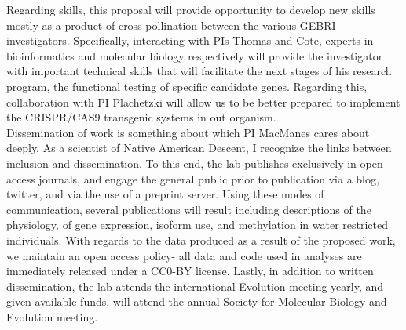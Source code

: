 \documentclass[11pt]{article}
\begin{document}
Regarding skills, this proposal will provide opportunity to develop new skills mostly as a product of cross-pollination between the various GEBRI investigators. Specifically, interacting with PIs Thomas and Cote, experts in bioinformatics and molecular biology respectively will provide the investigator with important technical skills that will facilitate the next stages of his research program, the functional testing of specific candidate genes. Regarding this, collaboration with PI Plachetzki will allow us to be better prepared to implement the CRISPR/CAS9 transgenic systems in out organism. \\

Dissemination of work is something about which PI MacManes cares about deeply. As a scientist of Native American Descent, I recognize the links between inclusion and dissemination. To this end, the lab publishes exclusively in open access journals, and engage the general public prior to publication via a blog, twitter, and via the use of a preprint server. Using these modes of communication, several publications will result including descriptions of the physiology, of gene expression, isoform use, and methylation in water restricted individuals. With regards to the data produced as a result of the proposed work, we maintain an open access policy- all data and code used in analyses are immediately released under a CC0-BY license. Lastly, in addition to written dissemination, the lab attends the international Evolution meeting yearly, and given available funds, will attend the annual Society for Molecular Biology and Evolution meeting. 











\newpage
\setcounter{page}{1}
\singlespacing


\end{document}
